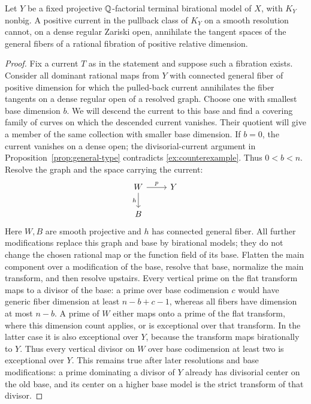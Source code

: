 \begin{proposition}\label{prop:no-pullback}
Let \(Y\) be a fixed projective \(\mathbb{Q}\)-factorial terminal
birational model of \(X\), with \(K_Y\) nonbig. A positive current
in the pullback class of \(K_Y\) on a smooth resolution cannot,
on a dense regular Zariski open, annihilate the tangent spaces
of the general fibers of a rational fibration of positive
relative dimension.
\end{proposition}
\begin{proof}
Fix a current \(T\) as in the statement and suppose such a fibration
exists. Consider all dominant rational maps from \(Y\) with
connected general fiber of positive dimension for which the
pulled-back current annihilates the fiber tangents on a dense
regular open of a resolved graph. Choose one with smallest base
dimension \(b\). We will descend the current to this base and
find a covering family of curves on which the descended current
vanishes. Their quotient will give a member of the same collection
with smaller base dimension.
If \(b=0\), the current vanishes on
a dense open; the divisorial-current argument in
Proposition~\ref{prop:general-type} contradicts
\eqref{ex:counterexample}. Thus \(0<b<n\).
Resolve the graph and the space carrying the current:
\[
 \begin{tikzcd}
 W \arrow[r,"p"] \arrow[d,"h"'] & Y \\
 B &
 \end{tikzcd}
\]
Here \(W,B\) are smooth projective and \(h\) has connected
general fiber. All further modifications replace this graph and
base by birational models; they do not change the chosen rational
map or the function field of its base.
Flatten the main component over a modification of the base,
resolve that base, normalize the main transform, and then resolve
upstairs. Every vertical prime on the flat
transform maps to a divisor of the base: a prime over base
codimension \(c\) would have generic fiber dimension at least
\(n-b+c-1\), whereas all fibers have dimension at most \(n-b\).
A prime of \(W\) either maps onto a prime of the flat transform,
where this dimension count applies, or is exceptional over that
transform. In the latter case it is also exceptional over \(Y\),
because the transform maps birationally to \(Y\). Thus every
vertical divisor on \(W\) over base codimension at least two is
exceptional over \(Y\). This remains true after later resolutions
and base modifications: a prime dominating a divisor of \(Y\)
already has divisorial center on the old base, and its center on
a higher base model is the strict transform of that divisor.


\end{proof}
